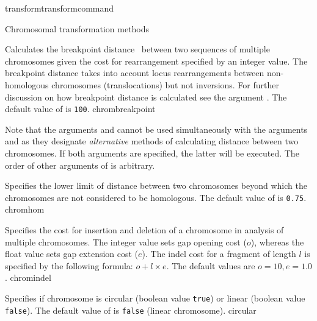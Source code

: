\begin{command}{transform}{transformcommand}
\begin{arguments}
\begin{argumentgroup}{Chromosomal transformation methods}
\begin{description}
      		     {Calculates the breakpoint distance~\cite{blanchetteetal1997}
                        between two sequences of multiple chromosomes given the cost for
                        rearrangement specified by an integer value. The breakpoint distance
                        takes into account locus rearrangements between non-homologous
                        chromosomes (translocations) but not inversions. For further discussion on 
                        how breakpoint distance is calculated see the argument .  
                        The default value of  is \texttt{100}.} 
                        {chrombreakpoint}

       
                   \begin{statement}
  		Note that the arguments  and  cannot be used
		simultaneously with the arguments  and 
		as they designate \emph{alternative} methods of calculating distance between two chromosomes.
		If both arguments are specified, the latter will be executed. The order of other arguments of
		 is arbitrary. 
		\end{statement}

                       {Specifies the lower limit of distance between two chromosomes
                        beyond which the chromosomes are not considered to be
                        homologous. The default value of 
                        is \texttt{0.75}.}
                        {chromhom}
                        
                        {Specifies the cost for insertion and deletion of a chromosome in analysis of
                        multiple chromosomes. The integer value sets gap opening
                        cost ($o$), whereas the float value sets gap extension
                        cost ($e$).  The indel cost for a fragment of length $l$ is
                        specified by the following formula:
                       $o + l \times e$. The default values are $o=10, e=1.0$.}
                        {chromindel}
 
                        {Specifies if chromosome is circular (boolean value 
                        \texttt{true}) or linear (boolean value \texttt{false}).
                        The default value of  is
                        \texttt{false} (linear chromosome).}
                        {circular}


\end{description}
\end{argumentgroup}
\end{arguments}
\end{command}
